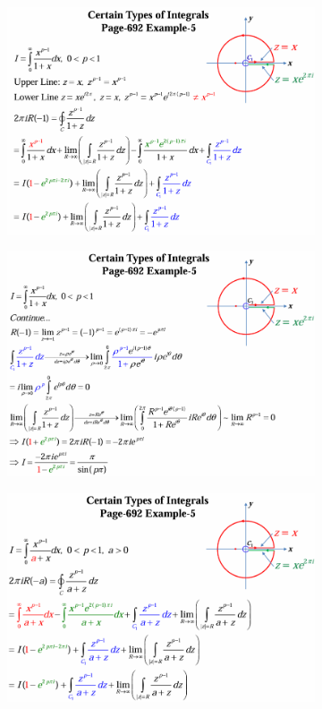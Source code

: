 \documentclass[10pt]{article}
\begin{document}
\begin{figure}[h]
	\centering
	\begin{subfigure}[b]{0.28\textwidth}
		\centering
		\includegraphics[width=\textwidth]{img3-6}
	\end{subfigure}
	\begin{subfigure}[b]{0.28\textwidth}
		\centering
		\includegraphics[width=\textwidth]{img3-7}
	\end{subfigure}
	\begin{subfigure}[b]{0.28\textwidth}
		\centering
		\includegraphics[width=\textwidth]{img3-8}

\end{subfigure}
\end{figure}
\end{document}
